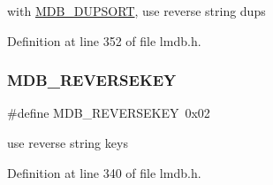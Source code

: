 with \mbox{\hyperlink{group__mdb__dbi__open_gae0626566c2562e9007f5c8c9535bab1a}{M\+D\+B\+\_\+\+D\+U\+P\+S\+O\+RT}}, use reverse string dups 

Definition at line 352 of file lmdb.\+h.

\mbox{\label{group__mdb__dbi__open_gaea2d873575b7875771ea5296b4c85beb}} 
\subsubsection{\texorpdfstring{M\+D\+B\+\_\+\+R\+E\+V\+E\+R\+S\+E\+K\+EY}{MDB\_REVERSEKEY}}
{\footnotesize\ttfamily \#define M\+D\+B\+\_\+\+R\+E\+V\+E\+R\+S\+E\+K\+EY~0x02}

use reverse string keys 

Definition at line 340 of file lmdb.\+h.

